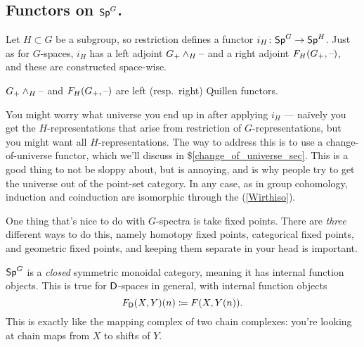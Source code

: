\subsection*{Functors on $\mathsf{Sp}^G$.}
Let $H\subset G$ be a subgroup, so restriction defines a functor $i_H\colon \mathsf{Sp}^G\to\mathsf{Sp}^H$. Just as for
$G$-spaces, $i_H$ has a left adjoint $G_+\wedge_H\text{--}$ and a right adjoint $F_H(G_+,\text{--})$, and these are constructed
space-wise.
\begin{prop}
$G_+\wedge_H\text{--}$ and $F_H(G_+,\text{--})$ are left (resp.\ right) Quillen functors.
\end{prop}
\begin{rem}
You might worry what universe you end up in after applying $i_H$ --- naïvely you get the $H$-representations that
arise from restriction of $G$-representations, but you might want all $H$-representations. The way to address this
is to use a change-of-universe functor, which we'll discuss in \$\ref{change_of_universe_sec}. This is a good thing
to not be sloppy about, but is annoying, and is why people try to get the universe out of the point-set category.
In any case, as in group cohomology, induction and coinduction are isomorphic through the  (\cref{Wirthiso}).
\end{rem}
One thing that's nice to do with $G$-spectra is take fixed points. There are \emph{three} different ways to do
this, namely homotopy fixed points, categorical fixed points, and geometric fixed points, and keeping them separate
in your head is important.

$\mathsf{Sp}^G$ is a \emph{closed} symmetric monoidal category, meaning it has internal function objects. This is true for
$\mathsf D$-spaces in general, with internal function objects
\[F_\mathsf D(X,Y)(n) \coloneqq F(X, Y(n)).\]
This is exactly like the mapping complex of two chain complexes: you're looking at chain maps from $X$ to shifts of
$Y$.

